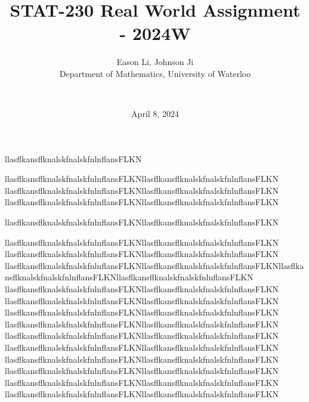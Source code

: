 \documentclass[final]{beamer}
\title{STAT-230 Real World Assignment - 2024W}
\author{
    Eason Li, Johnson Ji \\
    Department of Mathematics, University of Waterloo \and \\
}
\date{April 8, 2024} %
\begin{document}
\maketitle


\begin{minipage}{.5\textwidth}
    llasflkansflknalskfnalskfnlnflansFLKN
\end{minipage} 

\begin{minipage}{0.5\textwidth}
    llasflkansflknalskfnalskfnlnflansFLKNllasflkansflknalskfnalskfnlnflansFLKN
    llasflkansflknalskfnalskfnlnflansFLKNllasflkansflknalskfnalskfnlnflansFLKN
    llasflkansflknalskfnalskfnlnflansFLKNllasflkansflknalskfnalskfnlnflansFLKN

    llasflkansflknalskfnalskfnlnflansFLKNllasflkansflknalskfnalskfnlnflansFLKN

    llasflkansflknalskfnalskfnlnflansFLKNllasflkansflknalskfnalskfnlnflansFLKN
    llasflkansflknalskfnalskfnlnflansFLKNllasflkansflknalskfnalskfnlnflansFLKN    llasflkansflknalskfnalskfnlnflansFLKNllasflkansflknalskfnalskfnlnflansFLKNllasflkansflknalskfnalskfnlnflansFLKNllasflkansflknalskfnalskfnlnflansFLKN    llasflkansflknalskfnalskfnlnflansFLKNllasflkansflknalskfnalskfnlnflansFLKN
    llasflkansflknalskfnalskfnlnflansFLKNllasflkansflknalskfnalskfnlnflansFLKN
    llasflkansflknalskfnalskfnlnflansFLKNllasflkansflknalskfnalskfnlnflansFLKN    llasflkansflknalskfnalskfnlnflansFLKNllasflkansflknalskfnalskfnlnflansFLKN
    llasflkansflknalskfnalskfnlnflansFLKNllasflkansflknalskfnalskfnlnflansFLKN
    llasflkansflknalskfnalskfnlnflansFLKNllasflkansflknalskfnalskfnlnflansFLKN
    llasflkansflknalskfnalskfnlnflansFLKNllasflkansflknalskfnalskfnlnflansFLKN
    llasflkansflknalskfnalskfnlnflansFLKNllasflkansflknalskfnalskfnlnflansFLKN
    llasflkansflknalskfnalskfnlnflansFLKNllasflkansflknalskfnalskfnlnflansFLKN
    llasflkansflknalskfnalskfnlnflansFLKNllasflkansflknalskfnalskfnlnflansFLKN
\end{minipage}
\end{document}
